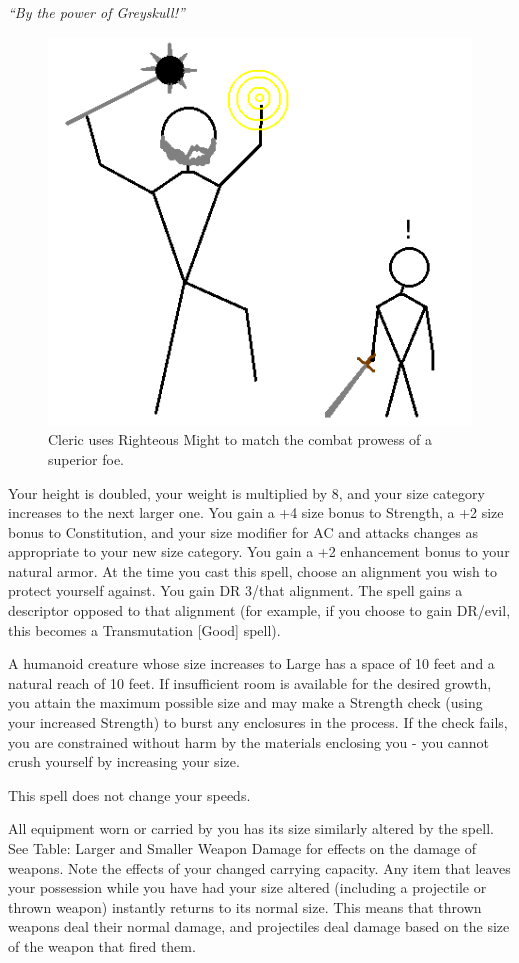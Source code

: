 \emph{``By the power of Greyskull!''}

\begin{figure}
  \caption{Cleric uses Righteous Might to match the combat prowess of a superior foe.}
  \centering
    \includegraphics{Pics/RighteousMight.png}
\end{figure}

Your height is doubled, your weight is multiplied by 8, and your size category increases to the next larger one.
You gain a +4 size bonus to Strength, a +2 size bonus to Constitution, 
and your size modifier for AC and attacks changes as appropriate to your new size category.
You gain a +2 enhancement bonus to your natural armor.
At the time you cast this spell, choose an alignment you wish to protect yourself against.
You gain DR 3/that alignment. The spell gains a descriptor opposed to that alignment
(for example, if you choose to gain DR/evil, this becomes a Transmutation [Good] spell).

A humanoid creature whose size increases to Large has a space of 10 feet and a natural reach of 10 feet.
If insufficient room is available for the desired growth, 
you attain the maximum possible size and may make a Strength check 
(using your increased Strength) to burst any enclosures in the process. 
If the check fails, you are constrained without harm by the materials enclosing you - 
you cannot crush yourself by increasing your size.

This spell does not change your speeds.

All equipment worn or carried by you has its size similarly altered by the spell. 
See Table: Larger and Smaller Weapon Damage for effects on the damage of weapons.
Note the effects of your changed carrying capacity.
Any item that leaves your possession while you have had your size altered (including a projectile or thrown weapon) 
instantly returns to its normal size. 
This means that thrown weapons deal their normal damage, and projectiles deal damage based on the size of the weapon that fired them. 

